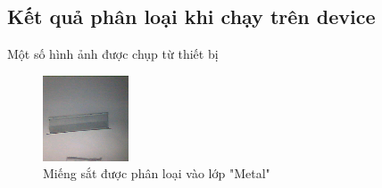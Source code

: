 \subsection{Kết quả phân loại khi chạy trên device}

Một số hình ảnh được chụp từ thiết bị
\begin{figure}[H]
    \centering
    \includegraphics[width=\linewidth]{images/Quanh/metal.bmp}
    \caption{ Miếng sắt được phân loại vào lớp "Metal" }
    \label{fig:Dmetal}
\end{figure}

